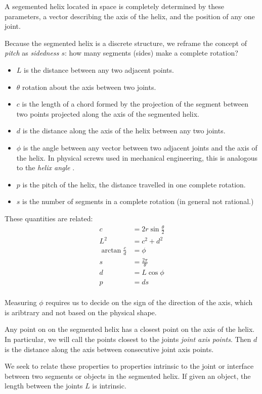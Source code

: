 \documentclass[11pt]{article}
\begin{document}
{A segemented helix located in space is completely determined by these parameters, a vector describing the axis
of the helix, and the position of any one joint.

Because the segmented helix is a discrete structure, we reframe the concept of {\em pitch} as {\em sidedness $s$}: how many segments (sides)
make a complete rotation?

\begin{itemize}
\item $L$ is the distance between any two adjacent points.
  \item $\theta$ rotation about the axis between two joints.
  \item $c$ is the length of a chord formed by the projection of the segment between two points projected along the axis of the segmented helix.
\item $d$ is the distance along the axis of the helix between any two joints.
\item $\phi$ is the angle between any vector between two adjacent joints and the axis of the helix. In physical screws used in mechanical engineering, this is analogous to the {\em helix angle} \cite{wiki:helixangle}.
  \item $p$ is the pitch of the helix, the distance travelled in one complete rotation.
  \item $s$ is the number of segments in a complete rotation (in general not rational.)
  \end{itemize}
These quantities are related:
\begin{align}
    c &= 2r\sin{\frac{\theta}{2}} \\
    L^2 &= c^2+d^2  \\
    \arctan{\frac{c}{d}}  &= \phi \\
    s &= \frac{2 \pi}{\theta} \\
    d &= L \cos{\phi} \\
    p &= d s \\
\end{align}

Measuring $\phi$ requires us to decide on the sign of the direction of the axis, which is aribtrary and not based on the
physical shape.

Any point on on the segmented helix has a closest point on the axis of the helix. In particular, we will call the points closest to the
joints {\em joint axis points}. Then $d$ is the distance along the axis between consecutive joint axis points.

We seek to relate these properties to properties intrinsic to the joint or interface between
two segments or objects in the segmented helix. If given an object, the length between the joints $L$ is intrinsic.

}
\end{document}
